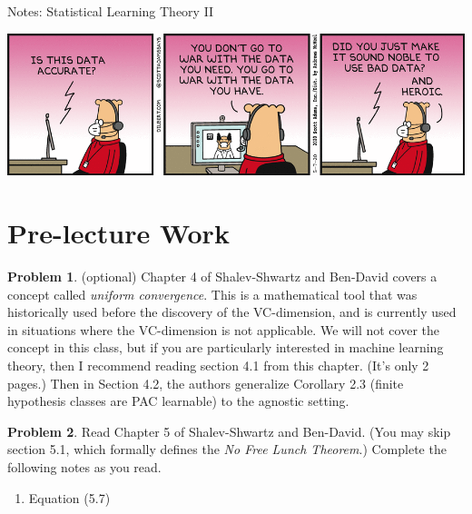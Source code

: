 \documentclass[10pt]{article}
\theoremstyle{definition}
\newtheorem{problem}{Problem}
\begin{document}
\begin{center}
\Huge
Notes: Statistical Learning Theory II
\end{center}

\begin{center}
%
\includegraphics[width=\textwidth]{dt200507}

\end{center}

\section{Pre-lecture Work}

\begin{problem}
    (optional)
    Chapter 4 of Shalev-Shwartz and Ben-David covers a concept called \emph{uniform convergence}.
    This is a mathematical tool that was historically used before the discovery of the VC-dimension,
    and is currently used in situations where the VC-dimension is not applicable.
    We will not cover the concept in this class,
    but if you are particularly interested in machine learning theory,
    then I recommend reading section 4.1 from this chapter.
    (It's only 2 pages.)
    Then in Section 4.2, the authors generalize Corollary 2.3 (finite hypothesis classes are PAC learnable) to the agnostic setting.
\end{problem}

\begin{problem}
    Read Chapter 5 of Shalev-Shwartz and Ben-David.
    (You may skip section 5.1, which formally defines the \emph{No Free Lunch Theorem}.)
    Complete the following notes as you read.
    \begin{enumerate}
        \item Equation (5.7)
            \vspace{3in}
    \end{enumerate}
\end{problem}
\end{document}
